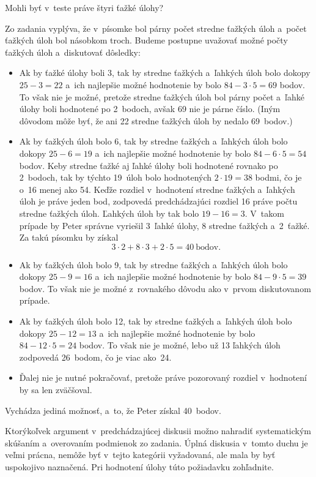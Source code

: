 {%
\napad
Mohli byť v~teste práve štyri ťažké úlohy?

\riesenie
Zo zadania vyplýva, že v~písomke bol párny počet stredne ťažkých úloh a~počet ťažkých úloh bol násobkom troch.
Budeme postupne uvažovať možné počty ťažkých úloh a~diskutovať dôsledky:
\begin{itemize}
\item
Ak by ťažké úlohy boli 3, tak by stredne ťažkých a~ľahkých úloh bolo dokopy ${25-3}=22$ a~ich najlepšie možné hodnotenie by bolo $84-3\cdot 5=69$ bodov.
To však nie je možné, pretože stredne ťažkých úloh bol párny počet a~ľahké úlohy boli hodnotené po 2~bodoch, avšak 69 nie je párne číslo.
(Iným dôvodom môže byť, že ani 22 stredne ťažkých úloh by nedalo 69~bodov.)
\item
Ak by ťažkých úloh bolo 6, tak by stredne ťažkých a~ľahkých úloh bolo dokopy $25-6=19$ a~ich najlepšie možné hodnotenie by bolo $84-6\cdot 5=54$ bodov.
Keby stredne ťažké aj ľahké úlohy boli hodnotené rovnako po 2~bodoch, tak by týchto 19~úloh bolo hodnotených $2\cdot 19=38$ bodmi, čo je o~16 menej ako 54.
Keďže rozdiel v~hodnotení stredne ťažkých a~ľahkých úloh je práve jeden bod, zodpovedá predchádzajúci rozdiel 16 práve počtu stredne ťažkých úloh.
Ľahkých úloh by tak bolo $19-16=3$.
V~takom prípade by Peter správne vyriešil 3~ľahké úlohy, 8 stredne ťažkých a~2~ťažké.
Za takú písomku by získal
$$
3\cdot2+8\cdot3+2\cdot5=40\ \text{bodov}.
$$
\item
Ak by ťažkých úloh bolo 9, tak by stredne ťažkých a~ľahkých úloh bolo dokopy $25-9=16$ a~ich najlepšie možné hodnotenie by bolo $84-9\cdot 5=39$ bodov.
To však nie je možné z~rovnakého dôvodu ako v~prvom diskutovanom prípade.
\item
Ak by ťažkých úloh bolo 12, tak by stredne ťažkých a~ľahkých úloh bolo dokopy $25-12=13$ a~ich najlepšie možné hodnotenie by bolo $84-12\cdot 5=24$ bodov.
To však nie je možné, lebo už 13 ľahkých úloh zodpovedá 26~bodom, čo je viac ako~24.
\item
Ďalej nie je nutné pokračovať, pretože práve pozorovaný rozdiel v~hodnotení by sa len zväčšoval.
\end{itemize}

Vychádza jediná možnosť, a~to, že Peter získal 40~bodov.

\poznamka
Ktorýkoľvek argument v~predchádzajúcej diskusii možno nahradiť systematickým skúšaním a~overovaním podmienok zo zadania.
Úplná diskusia v~tomto duchu je veľmi prácna, nemôže byť v~tejto kategórii vyžadovaná, ale mala by byť uspokojivo naznačená.
Pri hodnotení úlohy túto požiadavku zohľadnite.
}

